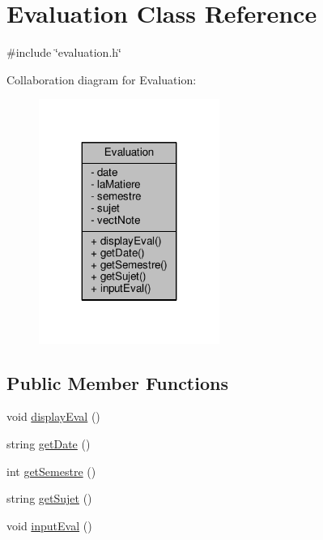 \hypertarget{classEvaluation}{\section{Evaluation Class Reference}
\label{classEvaluation}
}


{\ttfamily \#include \char`\"{}evaluation.\+h\char`\"{}}



Collaboration diagram for Evaluation\+:
\nopagebreak
\begin{figure}[H]
\begin{center}
\leavevmode
\includegraphics[width=167pt]{classEvaluation__coll__graph}
\end{center}
\end{figure}
\subsection*{Public Member Functions}
\begin{DoxyCompactItemize}
\item 
void \hyperlink{classEvaluation_a995f9aed723106120d515dd393add042}{display\+Eval} ()
\item 
string \hyperlink{classEvaluation_a0422d8511ef6913a77663f501b005681}{get\+Date} ()
\item 
int \hyperlink{classEvaluation_a3b3172b33d76a69282319313ef68104b}{get\+Semestre} ()
\item 
string \hyperlink{classEvaluation_a29ee8219f9f816fe16d883a0a0830394}{get\+Sujet} ()
\item 
void \hyperlink{classEvaluation_a20a82ccd6c57df23cc8743c9b447a5e9}{input\+Eval} ()
\end{DoxyCompactItemize}
